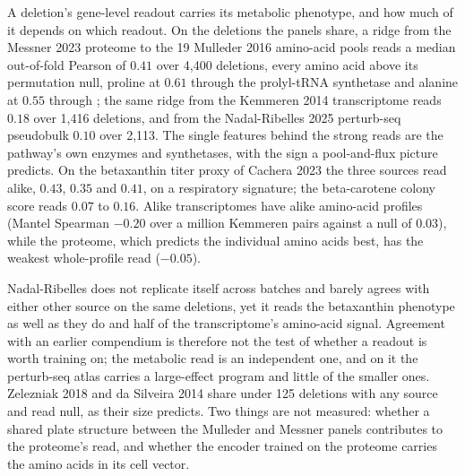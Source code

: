 A deletion's gene-level readout carries its metabolic phenotype, and how much of it
depends on which readout. On the deletions the panels share, a ridge from the Messner
2023 proteome to the 19 Mulleder 2016 amino-acid pools reads a median out-of-fold
Pearson of $0.41$ over 4{,}400 deletions, every amino acid above its permutation null,
proline at $0.61$ through the prolyl-tRNA synthetase and alanine at $0.55$ through
; the same ridge from the Kemmeren 2014 transcriptome reads $0.18$ over
1{,}416 deletions, and from the Nadal-Ribelles 2025 perturb-seq pseudobulk $0.10$ over
2{,}113. The single features behind the strong reads are the pathway's own enzymes and
synthetases, with the sign a pool-and-flux picture predicts. On the betaxanthin titer
proxy of Cachera 2023 the three sources read alike, $0.43$, $0.35$ and $0.41$, on a
respiratory signature; the beta-carotene colony score reads $0.07$ to $0.16$. Alike
transcriptomes have alike amino-acid profiles (Mantel Spearman $-0.20$ over a million
Kemmeren pairs against a null of $0.03$), while the proteome, which predicts the
individual amino acids best, has the weakest whole-profile read ($-0.05$).

Nadal-Ribelles does not replicate itself across batches and barely agrees with either
other source on the same deletions, yet it reads the betaxanthin phenotype as well as
they do and half of the transcriptome's amino-acid signal. Agreement with an earlier
compendium is therefore not the test of whether a readout is worth training on; the
metabolic read is an independent one, and on it the perturb-seq atlas carries a
large-effect program and little of the smaller ones. Zelezniak 2018 and da Silveira
2014 share under 125 deletions with any source and read null, as their size predicts.
Two things are not measured: whether a shared plate structure between the Mulleder and
Messner panels contributes to the proteome's read, and whether the encoder trained on
the proteome carries the amino acids in its cell vector.
